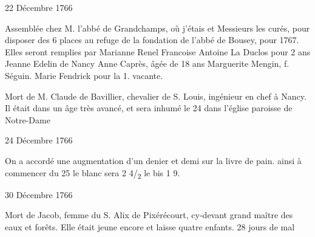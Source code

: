                      \begin{diary}{22 Décembre 1766}{}
                        
                         Assemblée chez
                           M. l’abbé de Grandchamps,
                           où j’étais et Messieurs les curés, pour disposer
                           des 6 places au refuge de la fondation
                              de l’abbé de Bousey, pour 1767.
                           Elles seront remplies par
                           Marianne Renel
                           Francoise Antoine
                           La Duclos pour 2 ans
                           Jeanne Edelin de Nancy
                           Anne Caprès, âgée de 18 ans
                           Marguerite Mengin,
                              f. Séguin.
                           Marie Fendrick pour la
                              1. vacante. \bigskip
        
        
                         Mort de M. Claude de Bavillier, chevalier de S. Louis,
                           ingénieur en chef à Nancy. Il
                           était dans un
                           âge très avancé, et sera inhumé le 24
                           dans
                           l’église paroisse de Notre-Dame
                        \bigskip
        
        
                     \end{diary}

                     \begin{diary}{24 Décembre 1766}{}
                        
                         On a accordé une augmentation d’un
                           denier
                           et demi sur la livre de pain. ainsi à commencer
                           du 25 le blanc sera 2 4/\textsubscript{2} le bis 1 9. \bigskip
        
        
                     \end{diary}
                     

                     \begin{diary}{30 Décembre 1766}{}
                        
                         Mort de 
                           Jacob, femme
                           du S. Alix de
                              Pixérécourt, cy-devant
                           grand maître
                           des eaux et forêts. Elle était jeune encore
                           et laisse quatre enfants. 28 jours de mal \bigskip
        
        
                     \end{diary}


